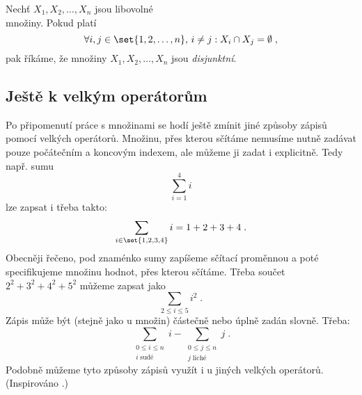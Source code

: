 \begin{definition}
    Nechť $X_1, X_2, \ldots, X_n$ jsou libovolné\\
    množiny. Pokud platí
    \begin{equation*}
        \forall i,j\in\set{1, 2, \ldots, n},\,i\neq j: X_i \cap X_j = \emptyset\; ,
    \end{equation*}
    pak říkáme, že množiny $X_1, X_2, \ldots, X_n$ jsou \emph{disjunktní}.
\end{definition}

\subsection{Ještě k velkým operátorům}\label{subsec:dodatek_velke_operatory}

Po připomenutí práce s množinami se hodí ještě zmínit jiné způsoby zápisů pomocí velkých operátorů. Množinu, přes kterou sčítáme nemusíme nutně zadávat pouze počátečním a koncovým indexem, ale můžeme ji zadat i explicitně. Tedy např. sumu
\begin{equation*}
    \sum_{i=1}^{4}{i}
\end{equation*}
lze zapsat i třeba takto:
\begin{equation*}
    \sum_{i \in \set{1,2,3,4}}{i}=1+2+3+4\; .
\end{equation*}
Obecněji řečeno, pod znaménko sumy zapíšeme sčítací proměnnou a poté specifikujeme množinu hodnot, přes kterou sčítáme. Třeba součet $2^2+3^2+4^2+5^2$ můžeme zapsat jako
\begin{equation*}
    \sum_{2 \leq i \leq 5}{i^2}\; .
\end{equation*}
Zápis může být (stejně jako u množin) částečně nebo úplně zadán slovně. Třeba:
\begin{equation*}
    \sum_{\substack{0 \leq i \leq n\\ i\;\text{sudé}}}{i}-\sum_{\substack{0 \leq j \leq n\\ j\;\text{liché}}}{j}\; .
\end{equation*}
Podobně můžeme tyto způsoby zápisů využít i u jiných velkých operátorů. (Inspirováno \cite{MatousekNesetril2009}.)